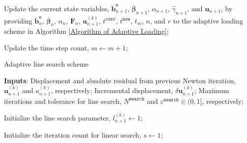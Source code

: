 \documentclass[preprint,11pt]{elsarticle}
\theoremstyle{definition}
\begin{document}
\begin{algorithm}[!htbp]
{{        Update the current state variables, $\overline{\mathbf{b}}_{n+1}^\texttt{e}$, $\overline{\boldsymbol{\beta}}_{n+1}$, $\alpha_{n+1}$, $\widehat{\gamma}_{n+1}$, and $\mathbf{u}_{n+1}$, by providing $\overline{\mathbf{b}}_n^\texttt{e}$, $\overline{\boldsymbol{\beta}}_n$, $\alpha_n$, $\mathbf{F}_n$, $\mathbf{u}_{n+1}^{(k)}$, $t^\texttt{conv}$, $t^\texttt{now}$, $t_m$, $n$, and $r$ to the adaptive loading scheme in Algorithm \ref{Algorithm of Adaptive Loading};
    }

    Update the time step count, $m \leftarrow m+1$;
}

\end{algorithm}

\begin{algorithm}[!htbp]
\caption{Adaptive line search scheme}
\label{Algorithm of Line Search}

\textbf{Inputs}: Displacement and absolute residual from previous Newton iteration, $\mathbf{u}_{n+1}^{(k)}$ and $a_{n+1}^{(k)}$, respectively;
Incremental displacement, $\delta \mathbf{u}_{n+1}^{(k)}$;
Maximum iterations and tolerance for line search, $N^\texttt{search}$ and $\varepsilon^\texttt{search} \in (0, 1]$, respectively;

Initialize the line search parameter, $l_{n+1}^{(k)} \leftarrow 1$;

Initialize the iteration count for linear search, $s \leftarrow 1$;

\end{algorithm}
\end{document}
